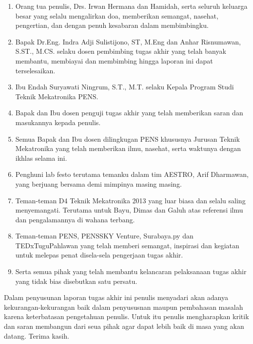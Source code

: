 \begin{dedication}
\begin{enumerate}
    \item Orang tua penulis, Drs. Irwan Hermana dan Hamidah, serta seluruh keluarga besar yang selalu mengalirkan doa, memberikan semangat, nasehat, pengertian, dan dengan penuh kesabaran dalam membimbingku.
    \item Bapak Dr.Eng. Indra Adji Sulistijono, ST, M.Eng dan Anhar Risnumawan, S.ST., M.CS. selaku dosen pembimbing tugas akhir yang telah banyak membantu, membiayai dan membimbing hingga laporan ini dapat terselesaikan.
    \item Ibu Endah Suryawati Ningrum, S.T., M.T. selaku Kepala Program Studi Teknik Mekatronika PENS.
    \item Bapak dan Ibu dosen penguji tugas akhir yang telah memberikan saran dan masukannya kepada penulis.
    \item Semua Bapak dan Ibu dosen dilingkugan PENS khususnya Jurusan Teknik Mekatronika yang telah memberikan ilmu, nasehat, serta waktunya dengan ikhlas selama ini.
    \item Penghuni lab festo terutama temanku dalam tim AESTRO, Arif Dharmawan, yang berjuang bersama demi mimpinya masing masing.
    \item Teman-teman D4 Teknik Mekatronika 2013 yang luar biasa dan selalu saling menyemangati. Terutama untuk Bayu, Dimas dan Galuh atas referensi ilmu dan pengalamannya di wahana terbang.
    \item Teman-teman PENS, PENSSKY Venture, Surabaya.py dan TEDxTuguPahlawan yang telah memberi semangat, inspirasi dan kegiatan untuk melepas penat disela-sela pengerjaan tugas akhir.
    \item Serta semua pihak yang telah membantu kelancaran pelaksanaan tugas akhir yang tidak bias disebutkan satu persatu.
\end{enumerate} 

Dalam penyusunan laporan tugas akhir ini penulis menyadari akan adanya kekurangan-kekurangan baik dalam penyususnan maupun pembahasan masalah karena keterbatasan pengetahuan penulis. Untuk itu penulis mengharapkan kritik dan saran membangun dari seua pihak agar dapat lebih baik di masa yang akan datang. Terima kasih.

\end{dedication}

